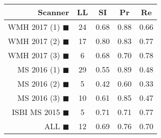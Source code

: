\begin{tabular}{rcccc}
\toprule
Scanner & LL & SI & Pr & Re \\
\midrule
WMH 2017 (1) {\color[rgb]{ 1.00 0.00 0.00}$\blacksquare$} & 24 & 0.68 & 0.88 & 0.66 \\
WMH 2017 (2) {\color[rgb]{ 1.00 0.50 0.00}$\blacksquare$} & 17 & 0.80 & 0.83 & 0.77 \\
WMH 2017 (3) {\color[rgb]{ 1.00 0.80 0.00}$\blacksquare$} & 6 & 0.68 & 0.70 & 0.78 \\
MS  2016 (1) {\color[rgb]{ 0.20 0.80 0.00}$\blacksquare$} & 29 & 0.55 & 0.89 & 0.48 \\
MS  2016 (2) {\color[rgb]{ 0.00 0.40 1.00}$\blacksquare$} & 5 & 0.42 & 0.60 & 0.33 \\
MS  2016 (3) {\color[rgb]{ 0.60 0.00 1.00}$\blacksquare$} & 10 & 0.61 & 0.85 & 0.47 \\
ISBI MS 2015 {\color[rgb]{ 1.00 0.00 1.00}$\blacksquare$} & 5 & 0.71 & 0.71 & 0.77 \\
\midrule
ALL {\color[rgb]{ 1.00 1.00 1.00}$\blacksquare$} & 12 & 0.69 & 0.76 & 0.70 \\
\bottomrule
\end{tabular}